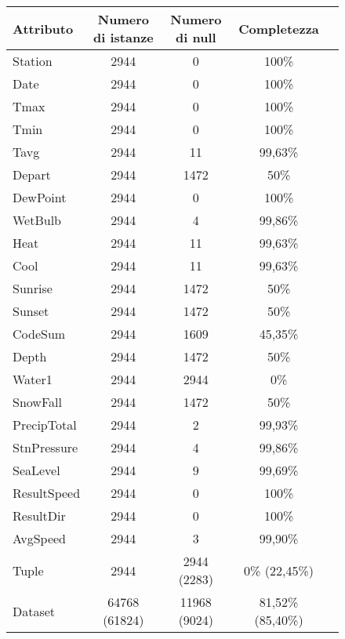 \begin{figure}[H]
	\centering
	\begin{tabular}{lcccc}
		\toprule
		\textbf{Attributo} \quad & \textbf{Numero di istanze} & \textbf{Numero di null} & \textbf{Completezza} \\
		\midrule
		Station     &               2944  & 0                      & 100\%      \\ 
		Date        &               2944  & 0                      & 100\%      \\ 
		Tmax        &               2944  & 0                      & 100\%      \\ 
		Tmin        &               2944  & 0                      & 100\%      \\ 
		Tavg        &               2944  & 11                     & 99,63\%    \\ 
		Depart      &               2944  & 1472                   & 50\%       \\ 
		DewPoint    &               2944  & 0                      & 100\%      \\ 
		WetBulb     &               2944  & 4                      & 99,86\%    \\ 
		Heat        &               2944  & 11                     & 99,63\%    \\ 
		Cool        &               2944  & 11                     & 99,63\%    \\ 
		Sunrise     &               2944  & 1472                   & 50\%       \\ 
		Sunset      &               2944  & 1472                   & 50\%       \\ 
		CodeSum     &               2944  & 1609                   & 45,35\%    \\ 
		Depth       &               2944  & 1472                   & 50\%       \\ 
		Water1      &               2944  & 2944                   & 0\%        \\ 
		SnowFall    &               2944  & 1472                   & 50\%       \\ 
		PrecipTotal &               2944  & 2                      & 99,93\%    \\ 
		StnPressure &               2944  & 4                      & 99,86\%    \\ 
		SeaLevel    &               2944  & 9                      & 99,69\%    \\ 
		ResultSpeed &               2944  & 0                      & 100\%      \\ 
		ResultDir   &               2944  & 0                      & 100\%      \\ 
		AvgSpeed    &               2944  & 3                      & 99,90\%	\\ 
		\midrule
		Tuple 		&				2944  &	2944 (2283)			   & 0\% (22,45\%)\\
		Dataset  	&	   64768 (61824)  &	11968 (9024) 		   & 81,52\% (85,40\%)\\
		\bottomrule
	\end{tabular}
	\label{tab:completezza weather}
\end{figure}


